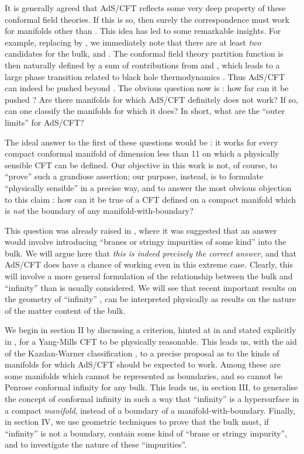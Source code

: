 \documentclass[a4paper,12pt]{article}
\theoremstyle{definition}
\renewcommand{\u}{\textit}
\renewcommand{\-}{\myHighlight{$\dfrac{\quad\enspace}{\quad}$}\coordHE{}}
\begin{document}
It is generally agreed that AdS/CFT reflects some very deep property of these conformal field theories. If this is so, then surely the correspondence must work for manifolds other than \coordHE{}. This idea \cite{3} has led to some remarkable insights. For example, replacing \coordHE{} by \coordHE{}, we immediately note that there are at least \u{two} candidates for the bulk, \coordHE{} and \coordHE{}. The conformal field theory partition function is then naturally defined by a sum of contributions from \coordHE{} and \coordHE{}, which leads to a large \coordHE{} phase transition related to black hole thermodynamics \cite{3}. Thus AdS/CFT can indeed be pushed beyond \coordHE{}. The obvious question now is : how far can it be pushed ? Are there manifolds for which AdS/CFT definitely does not work? If so, can one classify the manifolds for which it does? In short, what are the ``outer limits'' for AdS/CFT?

The ideal answer to the first of these questions would be : it works for every compact conformal manifold of dimension less than 11 on which a physically sensible CFT can be defined. Our objective in this work is not, of course, to ``prove'' such a grandiose assertion; our purpose, instead, is to formulate ``physically sensible'' in a precise way, and to answer the most obvious objection to this claim : how can it be true of a CFT defined on a compact manifold which is \u{not} the boundary of any manifold-with-boundary?

This question was already raised in \cite{3}, where it was suggested that an answer would involve introducing ``branes or stringy impurities of some kind'' into the bulk. We will argue here that \u{this is indeed precisely the correct answer}, and that AdS/CFT does have a chance of working even in this extreme case. Clearly, this will involve a more general formulation of the relationship between the bulk and ``infinity'' than is usually considered. We will see that recent important results on the geometry of ``infinity'' \cite{4}, \cite{5} can be interpreted physically as results on the nature of the matter content of the bulk.

We begin in section II by discussing a criterion, hinted at in \cite{3} and stated explicitly in \cite{6}, for a Yang-Mills CFT to be physically reasonable. This leads us, with the aid of the Kazdan-Warner classification \cite{7}, to a precise proposal as to the kinds of manifolds for which AdS/CFT should be expected to work. Among these are some manifolds which cannot be represented as boundaries, and so cannot be Penrose conformal infinity for any bulk. This leads us, in section III, to generalise the concept of conformal infinity in such a way that ``infinity'' is a hypersurface in a compact \u{manifold}, instead of a boundary of a manifold-with-boundary. Finally, in section IV, we use geometric techniques to prove that the bulk must, if ``infinity'' is not a boundary, contain some kind of ``brane or stringy impurity'', and to investigate the nature of these ``impurities''.
\end{document}
